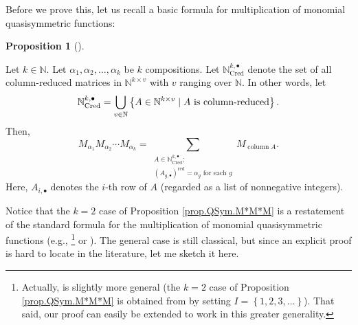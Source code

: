 \documentclass
[numbers=enddot,12pt,final,onecolumn,notitlepage,abstracton]{scrartcl}%
\theoremstyle{definition}
\newtheorem{prop}[theo]{Proposition}
\newenvironment{proposition}[1][]
{\begin{prop}[#1]\begin{leftbar}}
{\end{leftbar}\end{prop}}
\let\sumnonlimits\sum
\let\cupnonlimits\bigcup
\renewcommand{\sum}{\sumnonlimits\limits}
\renewcommand{\bigcup}{\cupnonlimits\limits}
\begin{document}
Before we prove this, let us recall a basic formula for multiplication of
monomial quasisymmetric functions:

\begin{proposition}
\label{prop.QSym.M*M*M}Let $k\in\mathbb{N}$. Let $\alpha_{1},\alpha_{2}%
,\ldots,\alpha_{k}$ be $k$ compositions. Let $\mathbb{N}_{\operatorname*{Cred}%
}^{k,\bullet}$ denote the set of all column-reduced matrices in $\mathbb{N}%
^{k\times v}$ with $v$ ranging over $\mathbb{N}$. In other words, let
\[
\mathbb{N}_{\operatorname{Cred}}^{k, \bullet} = \bigcup\limits_{v
\in\mathbb{N}} \left\{  A \in\mathbb{N}^{k \times v} \mid A \text{ is
column-reduced} \right\}  .
\]
Then,%
\[
M_{\alpha_{1}}M_{\alpha_{2}}\cdots M_{\alpha_{k}}=\sum_{\substack{A\in
\mathbb{N}_{\operatorname*{Cred}}^{k,\bullet};\\\left(  A_{g,\bullet}\right)
^{\operatorname*{red}}=\alpha_{g}\text{ for each }g}}M_{\operatorname*{column}%
A}.
\]
Here, $A_{i,\bullet}$ denotes the $i$-th row of $A$ (regarded as a list of
nonnegative integers).
\end{proposition}

Notice that the $k=2$ case of Proposition \ref{prop.QSym.M*M*M} is a
restatement of the standard formula for the multiplication of monomial
quasisymmetric functions (e.g., \cite[Proposition 5.1.3]{Reiner}%
\footnote{Actually, \cite[Proposition 5.1.3]{Reiner} is slightly more general
(the $k=2$ case of Proposition \ref{prop.QSym.M*M*M} is obtained from
\cite[Proposition 5.1.3]{Reiner} by setting $I=\left\{  1,2,3,\ldots\right\}
$). That said, our proof can easily be extended to work in this greater
generality.} or \cite[\S 11.26]{HazeWitt}). The general case is still
classical, but since an explicit proof is hard to locate in the literature,
let me sketch it here.
\end{document}
